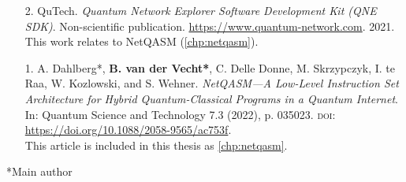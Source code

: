 \begin{enumerate}[label={\arabic*.},itemsep=0.7\baselineskip,parsep=0.3\baselineskip]
    \item[2.]
        QuTech.
        \textit{Quantum Network Explorer Software Development Kit (QNE SDK)}.
        Non-scientific publication.
        \url{https://www.quantum-network.com}.
        2021.
        This work relates to NetQASM (\cref{chp:netqasm}).

    \item[1.]
        A. Dahlberg*, \textbf{B. van der Vecht*}, C. Delle Donne, M. Skrzypczyk, I. te Raa, W. Kozlowski, and S. Wehner.
        \textit{NetQASM---A Low-Level Instruction Set Architecture for Hybrid Quantum-Classical Programs in a Quantum Internet}.
        In: Quantum Science and Technology 7.3 (2022), p. 035023.
        {\small \textsc{doi:}} \url{https://doi.org/10.1088/2058-9565/ac753f}.
        \\ \ficon This article is included in this thesis as \cref{chp:netqasm}.
\end{enumerate}

\vskip 5mm
\centerline{*Main author}

\begin{xstretch}
\printbibliography[heading=subbibintoc,title={References},notcategory=noprint]
\end{xstretch}
